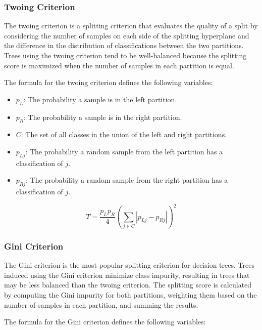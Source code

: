 \documentclass[10pt]{article} %
\begin{document}
\subsubsection{Twoing Criterion}\label{twoing}

The twoing criterion is a splitting criterion that evaluates the quality of a split by considering the number of samples on each side of the splitting hyperplane and the difference in the distribution of classifications between the two partitions. Trees using the twoing criterion tend to be well-balanced because the splitting score is maximized when the number of samples in each partition is equal.

The formula for the twoing criterion defines the following variables:

\begin{itemize}
    \setlength{\itemsep}{0.1em} 
    \item \( p_L \): The probability a sample is in the left partition.
    \item \( p_R \): The probability a sample is in the right partition.
    \item \( C \): The set of all classes in the union of the left and right partitions.
    \item \( p_{Lj} \): The probability a random sample from the left partition has a classification of \( j \).
    \item \( p_{Rj} \): The probability a random sample from the right partition has a classification of \( j \).
\end{itemize}

\begin{equation*}
T = \frac{p_L p_R}{4} \left( \sum_{j \in C} \left| p_{Lj} - p_{Rj} \right| \right)^2
	\label{twoing_equ}
\end{equation*}


\subsubsection{Gini Criterion}\label{gini}

The Gini criterion is the most popular splitting criterion for decision trees. Trees induced using the Gini criterion minimize class impurity, resulting in trees that may be less balanced than the twoing criterion. The splitting score is calculated by computing the Gini impurity for both partitions, weighting them based on the number of samples in each partition, and summing the results.

The formula for the Gini criterion defines the following variables:
\end{document}
